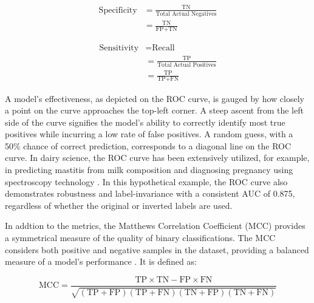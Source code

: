 \begin{equation} \label{eq_specificity}
    \begin{split}
    \text{Specificity} &= \frac{\text{TN}}{\text{Total Actual Negatives}} \\
                        &=\frac{\text{TN}}{\text{FP} + \text{TN}}
    \end{split}
\end{equation}

\begin{equation} \label{eq_sensitivity}
    \begin{split}
    \text{Sensitivity} &= \text{Recall} \\
                        &= \frac{\text{TP}}{\text{Total Actual Positives}} \\
                        &=\frac{\text{TP}}{\text{TP} + \text{FN}}
    \end{split}
\end{equation}

A model's effectiveness, as depicted on the ROC curve, is gauged by how closely a point on the curve approaches the top-left corner. A steep ascent from the left side of the curve signifies the model's ability to correctly identify most true positives while incurring a low rate of false positives. A random guess, with a 50\% chance of correct prediction, corresponds to a diagonal line on the ROC curve. In dairy science, the ROC curve has been extensively utilized, for example, in predicting mastitis from milk composition \citep{jensen_bayesian_2016} and diagnosing pregnancy using spectroscopy technology \citep{delhez_diagnosing_2020}. In this hypothetical example, the ROC curve also demonstrates robustness and label-invariance with a consistent AUC of 0.875, regardless of whether the original or inverted labels are used.

In addtion to the metrics, the Matthews Correlation Coefficient (MCC) provides a symmetrical measure of the quality of binary classifications. The MCC considers both positive and negative samples in the dataset, providing a balanced measure of a model's performance \citep{chicco_advantages_2020}. It is defined as:

\begin{equation} \label{eq_mcc}
    \text{MCC} = \frac{\text{TP} \times \text{TN} - \text{FP} \times \text{FN}}{\sqrt{(\text{TP} + \text{FP})(\text{TP} + \text{FN})(\text{TN} + \text{FP})(\text{TN} + \text{FN})}}
\end{equation}

